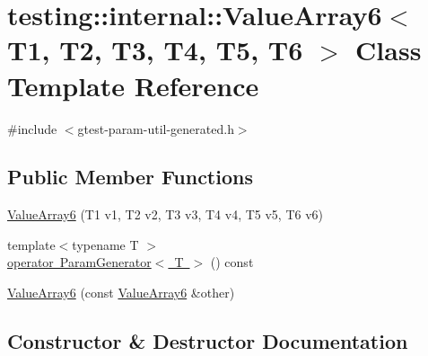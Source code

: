 \hypertarget{classtesting_1_1internal_1_1ValueArray6}{}\section{testing\+::internal\+::Value\+Array6$<$ T1, T2, T3, T4, T5, T6 $>$ Class Template Reference}
\label{classtesting_1_1internal_1_1ValueArray6}


{\ttfamily \#include $<$gtest-\/param-\/util-\/generated.\+h$>$}

\subsection*{Public Member Functions}
\begin{DoxyCompactItemize}
\item 
\mbox{\hyperlink{classtesting_1_1internal_1_1ValueArray6_ad1c323929591d89807220281ceb6d4d5}{Value\+Array6}} (T1 v1, T2 v2, T3 v3, T4 v4, T5 v5, T6 v6)
\item 
{\footnotesize template$<$typename T $>$ }\\\mbox{\hyperlink{classtesting_1_1internal_1_1ValueArray6_ab6cb557146bca7cf5fcfa40f10dee9da}{operator Param\+Generator$<$ T $>$}} () const
\item 
\mbox{\hyperlink{classtesting_1_1internal_1_1ValueArray6_a270702109b4185c6749310902fed7456}{Value\+Array6}} (const \mbox{\hyperlink{classtesting_1_1internal_1_1ValueArray6}{Value\+Array6}} \&other)
\end{DoxyCompactItemize}


\subsection{Constructor \& Destructor Documentation}
\mbox{\label{classtesting_1_1internal_1_1ValueArray6_ad1c323929591d89807220281ceb6d4d5}} 
